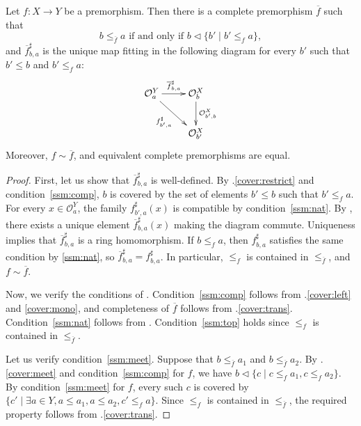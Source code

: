 \documentclass[reqno]{amsart}
\theoremstyle{definition}
\theoremstyle{remark}
\numberwithin{figure}{section}
\newcommand{\cover}{\triangleleft}
\begin{document}
\begin{lem}[closure]
Let $f : X \to Y$ be a premorphism.
Then there is a complete premorphism $\overline{f}$ such that
\[ b \leq_{\overline{f}} a \text{ if and only if } b \cover \{ b' \mid b' \leq_f a \}, \]
and $\overline{f}^\sharp_{b,a}$ is the unique map fitting in the following diagram for every $b'$ such that $b' \leq b$ and $b' \leq_f a$:
\[ \xymatrix{ \mathcal{O}^Y_a \ar[r]^{\overline{f}^\sharp_{b,a}} \ar[dr]_{f^\sharp_{b',a}} & \mathcal{O}^X_b \ar[d]^{\mathcal{O}^X_{b',b}} \\
                                                                                           & \mathcal{O}^X_{b'}
            } \]
Moreover, $f \sim \overline{f}$, and equivalent complete premorphisms are equal.
\end{lem}
\begin{proof}
First, let us show that $\overline{f}^\sharp_{b,a}$ is well-defined.
By .\eqref{cover:restrict} and condition~\eqref{ssm:comp}, $b$ is covered by the set of elements $b' \leq b$ such that $b' \leq_f a$.
For every $x \in \mathcal{O}^Y_a$, the family $f^\sharp_{b',a}(x)$ is compatible by condition~\eqref{ssm:nat}.
By , there exists a unique element $\overline{f}^\sharp_{b,a}(x)$ making the diagram commute.
Uniqueness implies that $\overline{f}^\sharp_{b,a}$ is a ring homomorphism.
If $b \leq_f a$, then $f^\sharp_{b,a}$ satisfies the same condition by \eqref{ssm:nat}, so $\overline{f}^\sharp_{b,a} = f^\sharp_{b,a}$.
In particular, $\leq_f$ is contained in $\leq_{\overline{f}}$, and $f \sim \overline{f}$.

Now, we verify the conditions of .
Condition~\eqref{ssm:comp} follows from .\eqref{cover:left} and \eqref{cover:mono},
and completeness of $\overline{f}$ follows from .\eqref{cover:trans}.
Condition~\eqref{ssm:nat} follows from .
Condition~\eqref{ssm:top} holds since $\leq_f$ is contained in $\leq_{\overline{f}}$.

Let us verify condition~\eqref{ssm:meet}.
Suppose that $b \leq_{\overline{f}} a_1$ and $b \leq_{\overline{f}} a_2$.
By .\eqref{cover:meet} and condition~\eqref{ssm:comp} for $f$, we have $b \cover \{ c \mid c \leq_f a_1, c \leq_f a_2 \}$.
By condition~\eqref{ssm:meet} for $f$, every such $c$ is covered by $\{ c' \mid \exists a \in Y, a \leq a_1, a \leq a_2, c' \leq_f a \}$.
Since $\leq_f$ is contained in $\leq_{\overline{f}}$, the required property follows from .\eqref{cover:trans}.


\end{proof}
\end{document}
